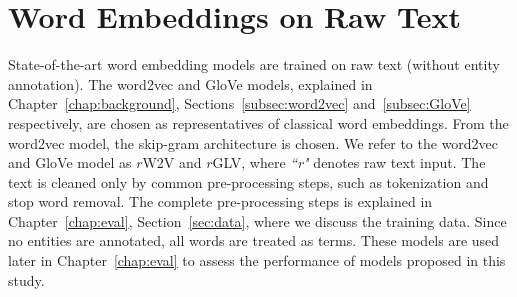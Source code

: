 \section{Word Embeddings on Raw Text}\label{sec:raw}
State-of-the-art word embedding models are trained on raw text (without entity annotation). The word2vec and GloVe models, explained in Chapter~\ref{chap:background}, Sections~\ref{subsec:word2vec} and~\ref{subsec:GloVe} respectively, are chosen as representatives of classical word embeddings. From the word2vec model, the skip-gram architecture is chosen. We refer to the word2vec and GloVe model as $r$W2V and  $r$GLV, where \emph{``r"} denotes raw text input. The text is cleaned only by common pre-processing steps, such as tokenization and stop word removal. The complete pre-processing steps is explained in Chapter~\ref{chap:eval}, Section~\ref{sec:data}, where we discuss the training data. 
Since no entities are annotated, all words are treated as terms. These models are used later in Chapter~\ref{chap:eval} to assess the performance of models proposed in this study. 

